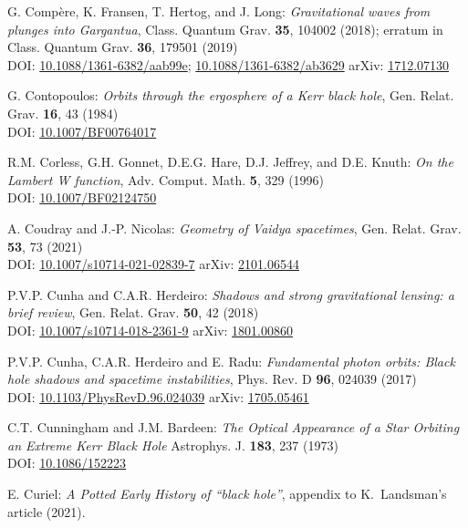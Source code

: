 \begin{thebibliography}{123}
G. Compère, K. Fransen, T. Hertog, and J. Long:
{\em Gravitational waves from plunges into Gargantua},
Class. Quantum Grav. {\bf 35}, 104002 (2018);
erratum in Class. Quantum Grav. {\bf 36}, 179501 (2019) \\
DOI: \href{https://doi.org/10.1088/1361-6382/aab99e}{10.1088/1361-6382/aab99e};
\href{https://doi.org/10.1088/1361-6382/ab3629}{10.1088/1361-6382/ab3629}
\hfill
arXiv: \href{https://arxiv.org/abs/1712.07130}{1712.07130}

G. Contopoulos:
{\em Orbits through the ergosphere of a Kerr black hole},
Gen. Relat. Grav. {\bf 16}, 43 (1984)\\
DOI: \href{https://doi.org/10.1007/BF00764017}{10.1007/BF00764017}

R.M. Corless, G.H. Gonnet, D.E.G. Hare, D.J. Jeffrey, and D.E. Knuth:
{\em On the Lambert W function},
Adv. Comput. Math. {\bf 5}, 329 (1996)\\
DOI: \href{https://doi.org/10.1007/BF02124750}{10.1007/BF02124750}

A. Coudray and J.-P. Nicolas:
{\em Geometry of Vaidya spacetimes},
Gen. Relat. Grav. {\bf 53}, 73 (2021)\\
DOI: \href{https://doi.org/10.1007/s10714-021-02839-7}{10.1007/s10714-021-02839-7}\hfill
arXiv: \href{https://arxiv.org/abs/2101.06544}{2101.06544}

P.V.P. Cunha and C.A.R. Herdeiro:
{\em Shadows and strong gravitational lensing: a brief review},
Gen. Relat. Grav. {\bf 50}, 42 (2018)\\
DOI: \href{https://doi.org/10.1007/s10714-018-2361-9}{10.1007/s10714-018-2361-9}\hfill
arXiv: \href{https://arxiv.org/abs/1801.00860}{1801.00860}

P.V.P. Cunha, C.A.R. Herdeiro and E. Radu:
{\em Fundamental photon orbits: Black hole shadows and spacetime instabilities},
Phys. Rev. D {\bf 96}, 024039 (2017)\\
DOI: \href{https://doi.org/10.1103/PhysRevD.96.024039}{10.1103/PhysRevD.96.024039}\hfill
arXiv: \href{https://arxiv.org/abs/1705.05461}{1705.05461}

C.T. Cunningham and J.M. Bardeen:
{\em The Optical Appearance of a Star Orbiting an Extreme Kerr Black Hole}
Astrophys. J. {\bf 183}, 237 (1973)\\
DOI: \href{https://doi.org/10.1086/152223}{10.1086/152223}

E. Curiel:
{\em A Potted Early History of ``black hole''},
appendix to K.~Landsman's article \cite{Lands21} (2021).


\end{thebibliography}
